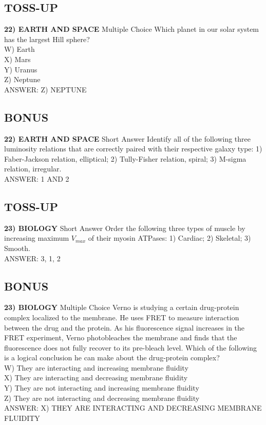 \documentclass{article}
\begin{document}
\subsection*{TOSS-UP}
\textbf{22) EARTH AND SPACE} Multiple Choice Which planet in our solar system has the largest Hill sphere?
\\W) Earth
\\X) Mars
\\Y) Uranus
\\Z) Neptune
\\ANSWER: Z) NEPTUNE

\subsection*{BONUS}
\textbf{22) EARTH AND SPACE} Short Answer Identify all of the following three luminosity relations that are correctly paired with their respective galaxy type: 1) Faber-Jackson relation, elliptical; 2) Tully-Fisher relation, spiral; 3) M-sigma relation, irregular.
\\ANSWER: 1 AND 2

\subsection*{TOSS-UP}
\textbf{23) BIOLOGY} Short Answer Order the following three types of muscle by increasing maximum $V_{max}$ of their myosin ATPases: 1) Cardiac; 2) Skeletal; 3) Smooth.
\\ANSWER: 3, 1, 2

\subsection*{BONUS}
\textbf{23) BIOLOGY} Multiple Choice Verno is studying a certain drug-protein complex localized to the membrane. He uses FRET to measure interaction between the drug and the protein. As his fluorescence signal increases in the FRET experiment, Verno photobleaches the membrane and finds that the fluorescence does not fully recover to its pre-bleach level. Which of the following is a logical conclusion he can make about the drug-protein complex?
\\W) They are interacting and increasing membrane fluidity
\\X) They are interacting and decreasing membrane fluidity
\\Y) They are not interacting and increasing membrane fluidity
\\Z) They are not interacting and decreasing membrane fluidity
\\ANSWER: X) THEY ARE INTERACTING AND DECREASING MEMBRANE FLUIDITY
\end{document}

